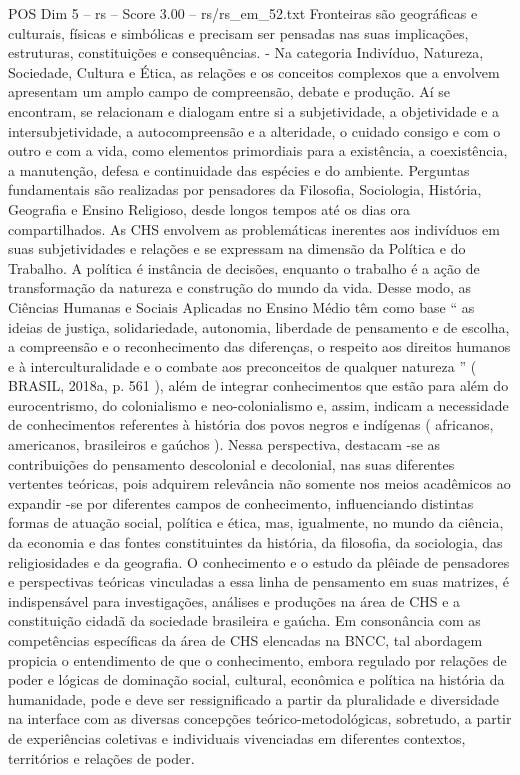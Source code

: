 \begin{textsample}{POS Dim 5 – rs – Score 3.00 – rs/rs\_em\_52.txt}
Fronteiras são geográficas e culturais, físicas e simbólicas e precisam ser pensadas nas suas implicações, estruturas, constituições e consequências. - Na categoria Indivíduo, Natureza, Sociedade, Cultura e Ética, as relações e os conceitos complexos que a envolvem apresentam um amplo campo de compreensão, debate e produção.
Aí se encontram, se relacionam e dialogam entre si a subjetividade, a objetividade e a intersubjetividade, a autocompreensão e a alteridade, o cuidado consigo e com o outro e com a vida, como elementos primordiais para a existência, a coexistência, a manutenção, defesa e continuidade das espécies e do ambiente.
Perguntas fundamentais são realizadas por pensadores da Filosofia, Sociologia, História, Geografia e Ensino Religioso, desde longos tempos até os dias ora compartilhados.
As CHS envolvem as problemáticas inerentes aos indivíduos em suas subjetividades e relações e se expressam na dimensão da Política e do Trabalho.
A política é instância de decisões, enquanto o trabalho é a ação de transformação da natureza e construção do mundo da vida.
Desse modo, as Ciências Humanas e Sociais Aplicadas no Ensino Médio têm como base “ as ideias de justiça, solidariedade, autonomia, liberdade de pensamento e de escolha, a compreensão e o reconhecimento das diferenças, o respeito aos direitos humanos e à interculturalidade e o combate aos preconceitos de qualquer natureza ” ( BRASIL, 2018a, p. 561 ), além de integrar conhecimentos que estão para além do eurocentrismo, do colonialismo e neo-colonialismo e, assim, indicam a necessidade de conhecimentos referentes à história dos povos negros e indígenas ( africanos, americanos, brasileiros e gaúchos ).
Nessa perspectiva, destacam -se as contribuições do pensamento descolonial e decolonial, nas suas diferentes vertentes teóricas, pois adquirem relevância não somente nos meios acadêmicos ao expandir -se por diferentes campos de conhecimento, influenciando distintas formas de atuação social, política e ética, mas, igualmente, no mundo da ciência, da economia e das fontes constituintes da história, da filosofia, da sociologia, das religiosidades e da geografia.
O conhecimento e o estudo da plêiade de pensadores e perspectivas teóricas vinculadas a essa linha de pensamento em suas matrizes, é indispensável para investigações, análises e produções na área de CHS e a constituição cidadã da sociedade brasileira e gaúcha.
Em consonância com as competências específicas da área de CHS elencadas na BNCC, tal abordagem propicia o entendimento de que o conhecimento, embora regulado por relações de poder e lógicas de dominação social, cultural, econômica e política na história da humanidade, pode e deve ser ressignificado a partir da pluralidade e diversidade na interface com as diversas concepções teórico-metodológicas, sobretudo, a partir de experiências coletivas e individuais vivenciadas em diferentes contextos, territórios e relações de poder.

\end{textsample}
